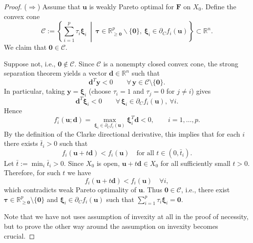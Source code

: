 \documentclass{article}
\theoremstyle{definition}
\begin{document}
\begin{proof}
($\Rightarrow$) 
Assume that $\boldsymbol u$ is weakly Pareto optimal for $\boldsymbol F$ on $X_0$.
Define the convex cone
\[
\mathcal{C}:=\left\{\sum_{i=1}^p \tau_i \boldsymbol\xi_i \ \middle|\ 
\boldsymbol\tau\in\mathbb{R}^p_{\ge \boldsymbol 0}\backslash \{\boldsymbol 0 \},\ \boldsymbol\xi_i\in\partial_C f_i(\boldsymbol u)\right\}
\subset \mathbb{R}^n.
\]
We claim that $\boldsymbol 0\in\mathcal{C}$.

Suppose not, i.e., $\boldsymbol 0\notin\mathcal{C}$. Since $\mathcal{C}$ is a nonempty closed convex cone,
the strong separation theorem \cite{Rockafellar} yields a vector $\boldsymbol d\in\mathbb{R}^n$ such that
\[
\boldsymbol d^T \boldsymbol y < 0 \qquad \forall\, \boldsymbol y\in \mathcal{C}\setminus\{\boldsymbol 0\}.
\]
In particular, taking $\boldsymbol y=\boldsymbol\xi_i$ (choose $\tau_i=1$ and $\tau_j=0$ for $j\neq i$) gives
\[
\boldsymbol d^T \boldsymbol\xi_i < 0 \qquad \forall\, \boldsymbol\xi_i\in\partial_C f_i(\boldsymbol u),\ \forall i.
\]
Hence
\[
f_i^{\circ}(\boldsymbol u;\boldsymbol d)
= \max_{\boldsymbol\xi_i\in\partial_C f_i(\boldsymbol u)} \boldsymbol\xi_i^T\boldsymbol d
<0,\qquad i=1,\dots,p.
\]
By the definition of the Clarke directional derivative, this implies that for each $i$ there exists $\bar t_i>0$ such that
\[
f_i(\boldsymbol u+t\boldsymbol d) < f_i(\boldsymbol u) \quad \text{for all }t\in(0,\bar t_i).
\]
Let $\bar t:=\min_i \bar t_i>0$. Since $X_0$ is open, $\boldsymbol u+t\boldsymbol d\in X_0$ for all sufficiently small $t>0$.
Therefore, for such $t$ we have
\[
f_i(\boldsymbol u+t\boldsymbol d) < f_i(\boldsymbol u)\quad \forall i,
\]
which contradicts weak Pareto optimality of $\boldsymbol u$.
Thus $\boldsymbol 0\in\mathcal{C}$, i.e., there exist $\boldsymbol\tau\in\mathbb{R}^p_{\ge \boldsymbol 0}\setminus\{\boldsymbol 0\}$
and $\boldsymbol\xi_i\in\partial_C f_i(\boldsymbol u)$ such that $\sum_{i=1}^p \tau_i \boldsymbol\xi_i=\boldsymbol 0$.

Note that we have not uses assumption of invexity at all in the proof of necessity, but to prove the other way around the assumption on invexity becomes crucial.


\end{proof}
\end{document}
